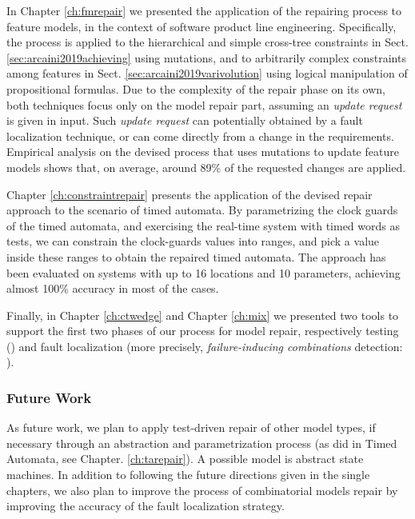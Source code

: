 \begin{tikzborder}{\cite{Gargantini16:validation}}
\begin{tikzborder}{\cite{gargantini_combinatorial_2017}}
\begin{tikzborder}{\cite{gargantini_combinatorial_2017}}
\begin{tikzborder}{\cite{garn2019}}
\begin{tikzborder}{\cite{arcaini2019achieving}}
In Chapter \ref{ch:fmrepair} we presented the application of the repairing process to feature models, in the context of software product line engineering.
Specifically, the process is applied to the hierarchical and simple cross-tree constraints in Sect. \ref{sec:arcaini2019achieving} using mutations, and to arbitrarily complex constraints among features in Sect. \ref{sec:arcaini2019varivolution} using logical manipulation of propositional formulas.
Due to the complexity of the repair phase on its own, both techniques focus only on the model repair part, assuming an \textit{update request} is given in input. Such \textit{update request} can potentially obtained by a fault localization technique, or can come directly from a change in the requirements.
Empirical analysis on the devised process that uses mutations to update feature models shows that, on average, around 89\% of the requested changes are applied.

Chapter \ref{ch:constraintrepair} presents the application of the devised repair approach to the scenario of timed automata. By parametrizing the clock guards of the timed automata, and exercising the real-time system with timed words as tests, we can constrain the clock-guards values into ranges, and pick a value inside these ranges to obtain the repaired timed automata. The approach has been evaluated on systems with up to 16 locations and 10 parameters, achieving almost 100\% accuracy in most of the cases.

Finally, in Chapter \ref{ch:ctwedge} and Chapter \ref{ch:mix} we presented two tools to support the first two phases of our process for model repair, respectively testing (\ctwedge) and fault localization (more precisely, \textit{failure-inducing combinations} detection: \mix).

\subsubsection{Future Work}
As future work, we plan to apply test-driven repair of other model types, if necessary through an abstraction and parametrization process (as did in Timed Automata, see Chapter. \ref{ch:tarepair}). A possible model is abstract state machines. 
In addition to following the future directions given in the single chapters, we also plan to improve the process of combinatorial models repair by improving the accuracy of the fault localization strategy.


\end{tikzborder}
\end{tikzborder}
\end{tikzborder}
\end{tikzborder}
\end{tikzborder}
